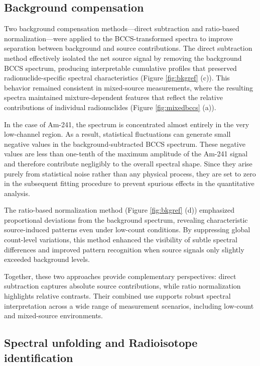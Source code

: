 \documentclass[10pt]{wlscirep}
\begin{document}
\subsection*{Background compensation}

Two background compensation methods—direct subtraction and ratio-based normalization—were applied to the BCCS-transformed spectra to improve separation between background and source contributions. The direct subtraction method effectively isolated the net source signal by removing the background BCCS spectrum, producing interpretable cumulative profiles that preserved radionuclide-specific spectral characteristics (Figure \ref{fig:bkgref} (c)). This behavior remained consistent in mixed-source measurements, where the resulting spectra maintained mixture-dependent features that reflect the relative contributions of individual radionuclides (Figure \ref{fig:mixedbccs} (a)). 

In the case of Am-241, the spectrum is concentrated almost entirely in the very low-channel region. As a result, statistical fluctuations can generate small negative values in the background-subtracted BCCS spectrum. These negative values are less than one-tenth of the maximum amplitude of the Am-241 signal and therefore contribute negligibly to the overall spectral shape. Since they arise purely from statistical noise rather than any physical process, they are set to zero in the subsequent fitting procedure to prevent spurious effects in the quantitative analysis. 

The ratio-based normalization method (Figure \ref{fig:bkgref} (d)) emphasized proportional deviations from the background spectrum, revealing characteristic source-induced patterns even under low-count conditions. By suppressing global count-level variations, this method enhanced the visibility of subtle spectral differences and improved pattern recognition when source signals only slightly exceeded background levels.

Together, these two approaches provide complementary perspectives: direct subtraction captures absolute source contributions, while ratio normalization highlights relative contrasts. Their combined use supports robust spectral interpretation across a wide range of measurement scenarios, including low-count and mixed-source environments.

\subsection*{Spectral unfolding and Radioisotope identification}
\end{document}
